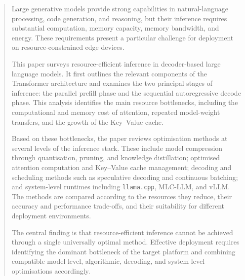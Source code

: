 

\begingroup
\begin{abstract}
Large generative models provide strong capabilities in natural-language processing,
code generation, and reasoning, but their inference requires substantial computation,
memory capacity, memory bandwidth, and energy. These requirements present a particular
challenge for deployment on resource-constrained edge devices.

This paper surveys resource-efficient inference in decoder-based large language models.
It first outlines the relevant components of the Transformer architecture and examines
the two principal stages of inference: the parallel prefill phase and the sequential
autoregressive decode phase. This analysis identifies the main resource bottlenecks,
including the computational and memory cost of attention, repeated model-weight
transfers, and the growth of the Key--Value cache.

Based on these bottlenecks, the paper reviews optimisation methods at several levels of
the inference stack. These include model compression through quantisation, pruning, and
knowledge distillation; optimised attention computation and Key--Value cache management;
decoding and scheduling methods such as speculative decoding and continuous batching;
and system-level runtimes including \texttt{llama.cpp}, MLC-LLM, and vLLM. The methods
are compared according to the resources they reduce, their accuracy and performance
trade-offs, and their suitability for different deployment environments.

The central finding is that resource-efficient inference cannot be achieved through a
single universally optimal method. Effective deployment requires identifying the dominant
bottleneck of the target platform and combining compatible model-level, algorithmic,
decoding, and system-level optimisations accordingly.
\end{abstract}
\endgroup
\cleardoublepage


\tableofcontents
\cleardoublepage


\listoffigures
\cleardoublepage



\printglossary[type=\acronymtype, title={List of Abbreviations}, style=list]
\cleardoublepage
